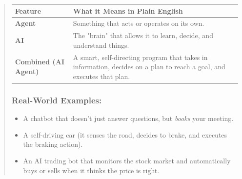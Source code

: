 \begin{quote}
    \begin{tabular}{|p{3cm}|p{10cm}|}
        \hline
        \textbf{Feature}             & \textbf{What it Means in Plain English}                                                                               \\
        \hline
        \textbf{Agent}               & Something that acts or operates on its own.                                                                           \\
        \hline
        \textbf{AI}                  & The "brain" that allows it to learn, decide, and understand things.                                                   \\
        \hline
        \textbf{Combined (AI Agent)} & A smart, self-directing program that takes in information, decides on a plan to reach a goal, and executes that plan. \\
        \hline
    \end{tabular}

    \subsubsection*{Real-World Examples:}

    \begin{itemize}
        \item A chatbot that doesn't just answer questions, but \textit{books} your meeting.
        \item A self-driving car (it senses the road, decides to brake, and executes the braking action).
        \item An AI trading bot that monitors the stock market and automatically buys or sells when it thinks the price is right.
    \end{itemize}
\end{quote}




